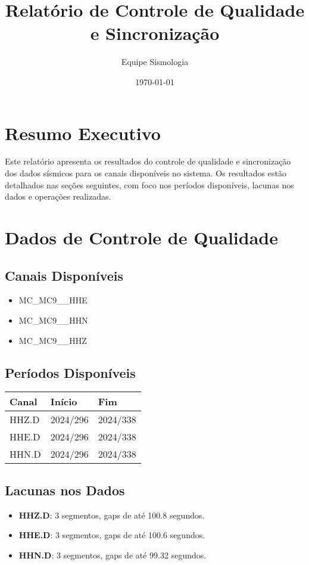 \documentclass[12pt]{article}
\title{Relatório de Controle de Qualidade e Sincronização}
\author{Equipe Sismologia}
\date{\today}
\begin{document}
\maketitle
\tableofcontents
\clearpage

\section{Resumo Executivo}
Este relatório apresenta os resultados do controle de qualidade e sincronização dos dados sísmicos para os canais disponíveis no sistema. Os resultados estão detalhados nas seções seguintes, com foco nos períodos disponíveis, lacunas nos dados e operações realizadas.

\section{Dados de Controle de Qualidade}
\subsection{Canais Disponíveis}
\begin{itemize}
    \item MC\_MC9\_\_HHE
    \item MC\_MC9\_\_HHN
    \item MC\_MC9\_\_HHZ
\end{itemize}

\subsection{Períodos Disponíveis}
\begin{longtable}{@{}lll@{}}
\toprule
\textbf{Canal} & \textbf{Início} & \textbf{Fim} \\ \midrule
HHZ.D & 2024/296 & 2024/338 \\
HHE.D & 2024/296 & 2024/338 \\
HHN.D & 2024/296 & 2024/338 \\ \bottomrule
\end{longtable}

\subsection{Lacunas nos Dados}
\begin{itemize}
    \item \textbf{HHZ.D}: 3 segmentos, gaps de até 100.8 segundos.
    \item \textbf{HHE.D}: 3 segmentos, gaps de até 100.6 segundos.
    \item \textbf{HHN.D}: 3 segmentos, gaps de até 99.32 segundos.
\end{itemize}
\end{document}
